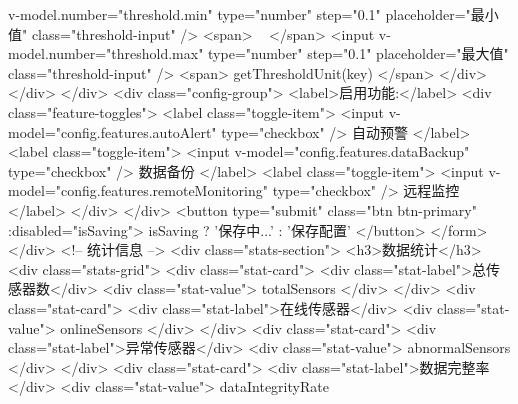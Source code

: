 v-model.number="threshold.min" type="number" step="0.1" placeholder="最小值" class="threshold-input" /> <span> ~ </span> <input v-model.number="threshold.max" type="number" step="0.1" placeholder="最大值" class="threshold-input" /> <span>{{ getThresholdUnit(key) }}</span> </div> </div> </div> <div class="config-group"> <label>启用功能:</label> <div class="feature-toggles"> <label class="toggle-item"> <input v-model="config.features.autoAlert" type="checkbox" /> 自动预警 </label> <label class="toggle-item"> <input v-model="config.features.dataBackup" type="checkbox" /> 数据备份 </label> <label class="toggle-item"> <input v-model="config.features.remoteMonitoring" type="checkbox" /> 远程监控 </label> </div> </div> <button type="submit" class="btn btn-primary" :disabled="isSaving"> {{ isSaving ? '保存中...' : '保存配置' }} </button> </form> </div> <!-- 统计信息 --> <div class="stats-section"> <h3>数据统计</h3> <div class="stats-grid"> <div class="stat-card"> <div class="stat-label">总传感器数</div> <div class="stat-value">{{ totalSensors }}</div> </div> <div class="stat-card"> <div class="stat-label">在线传感器</div> <div class="stat-value">{{ onlineSensors }}</div> </div> <div class="stat-card"> <div class="stat-label">异常传感器</div> <div class="stat-value">{{ abnormalSensors }}</div> </div> <div class="stat-card"> <div class="stat-label">数据完整率</div> <div class="stat-value">{{ dataIntegrityRate }}%